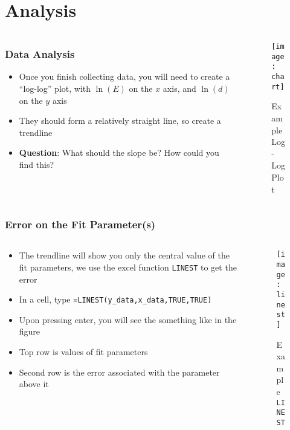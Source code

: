 \documentclass[aspectratio=169]{beamer}
\begin{document}
\section{Analysis}
\begin{frame}
  \begin{columns}
    \begin{column}{0.5\textwidth}
      \frametitle{Data Analysis}
      \begin{itemize}
      \item Once you finish collecting data, you will need to create a ``log-log'' plot, with $\ln(E)$ on the $x$ axis, and $\ln(d)$ on the $y$ axis
      \item They should form a relatively straight line, so create a trendline
      \item \textbf{Question}: What should the slope be? How could you find this?
      \end{itemize}
    \end{column}
    \pause
    \begin{column}{0.5\textwidth}
      \begin{figure}[H]
        \centering
        \texttt{[image: chart]}
        \caption{Example Log-Log Plot}
      \end{figure}
    \end{column}
  \end{columns}
\end{frame}

\begin{frame}
  \frametitle{Error on the Fit Parameter(s)}
  \begin{columns}
    \begin{column}{0.6\textwidth}
      \begin{itemize}
      \item The trendline will show you only the central value of the fit parameters, we use the excel function \texttt{LINEST} to get the error
      \item In a cell, type \texttt{=LINEST(y\_data,x\_data,TRUE,TRUE)}
      \item Upon pressing enter, you will see the something like in the figure
      \item Top row is values of fit parameters
      \item Second row is the error associated with the parameter above it
      \end{itemize}
    \end{column}
    \begin{column}{0.4\textwidth}
      \begin{figure}[H]
        \centering
        \texttt{[image: linest]}
        \caption{Example \texttt{LINEST}}
      \end{figure}
    \end{column}
  \end{columns}
\end{frame}
\end{document}

